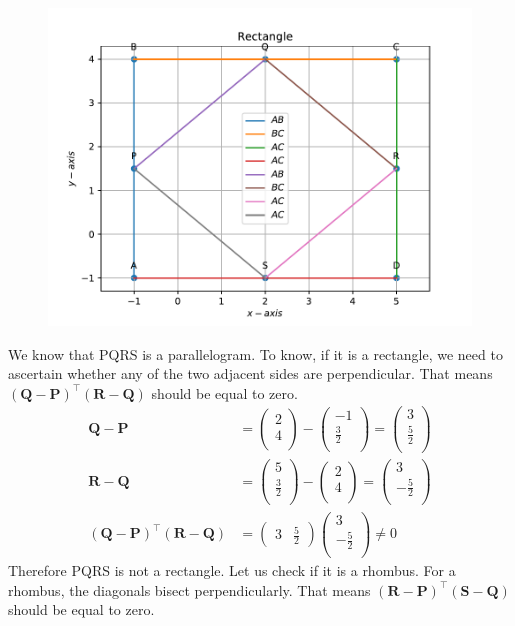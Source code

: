 \documentclass[12pt]{article}
\providecommand{\brak}[1]{\ensuremath{\left(#1\right)}}
\newcommand{\myvec}[1]{\ensuremath{\begin{pmatrix}#1\end{pmatrix}}}
\let\vec\mathbf
\begin{document}
\begin{enumerate}
\begin{figure}[!h]
	\begin{center}
		\includegraphics[width=\columnwidth]{./figs/problem1.pdf}
	\end{center}
\caption{}
\label{fig:Fig3}
\end{figure}
We know that PQRS is a parallelogram. To know, if it is a rectangle, we need to ascertain whether any of the two adjacent sides are perpendicular. 
That means $\brak{\vec{Q}-\vec{P}}^\top\brak{\vec{R}-\vec{Q}}$ should be equal to zero. \\
\begin{align}
\vec{Q}-\vec{P} &=  \myvec{
 2 \\
 4 \\
 } - \myvec{
 -1 \\
 \frac{3}{2} \\
 } = \myvec{
 3 \\
 \frac{5}{2} \\ 
 } \\
 \vec{R}-\vec{Q} &=  \myvec{
 5 \\
 \frac{3}{2}\\
 } - \myvec{
 2 \\
 4 \\
 } = \myvec{
 3 \\
 -\frac{5}{2} \\ 
 } \\ 
 \brak{\vec{Q}-\vec{P}}^\top\brak{\vec{R}-\vec{Q}} &= \myvec{
 3 & \frac{5}{2}} \myvec{
 3 \\
 -\frac{5}{2} \\
 } \neq 0
\end{align}
Therefore PQRS is not a rectangle. Let us check if it is a rhombus. For a rhombus, the diagonals bisect perpendicularly. That means $\brak{\vec{R}-\vec{P}}^\top\brak{\vec{S}-\vec{Q}}$ should be equal to zero. \\



\end{enumerate}
\end{document}
